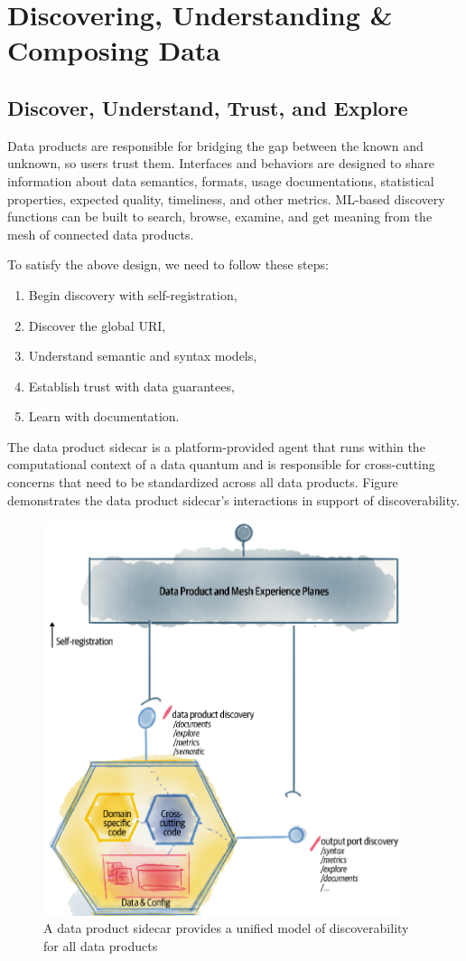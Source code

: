 \documentclass[12pt, a4paper]{book}
\begin{document}
\section{Discovering, Understanding \& Composing Data}
\subsection{Discover, Understand, Trust, and Explore}
Data products are responsible for bridging the gap between the known and unknown, so users trust them. Interfaces and behaviors are designed to share information about data semantics, formats, usage documentations, statistical properties, expected quality, timeliness, and other metrics. ML-based discovery functions can be built to search, browse, examine, and get meaning from the mesh of connected data products.

To satisfy the above design, we need to follow these steps:
	\begin{enumerate}
		\item Begin discovery with self-registration,
		\item Discover the global URI,
		\item Understand semantic and syntax models,
		\item Establish trust with data guarantees,
		\item Learn with documentation.
	\end{enumerate}

The data product sidecar is a platform-provided agent that runs within the computational context of a data quantum and is responsible for cross-cutting concerns that need to be standardized across all data products. Figure demonstrates the data product sidecar’s interactions in support of discoverability. 

\begin{figure}[h]
	\begin{framed}
		\centering
		\includegraphics[width=10.5cm]{DiscoverData.png}
		\caption{A data product sidecar provides a unified model of discoverability for all data products}
		\label{DiscoverData}
	\end{framed}
\end{figure}
\vspace{-.3cm}
\end{document}
